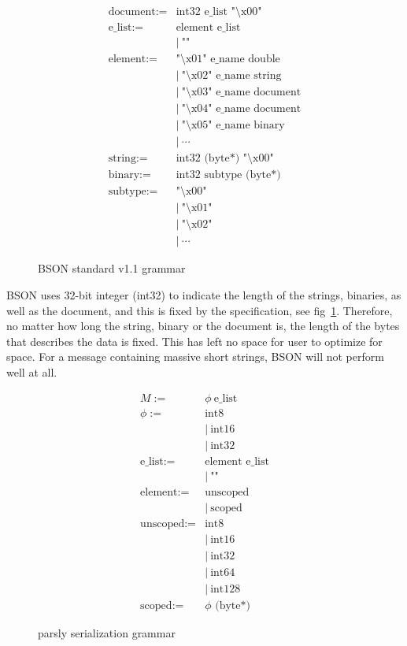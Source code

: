 \documentclass{article}
\begin{document}
\begin{figure}[h!]
\begin{align*}
\text{document} :=&  \text{int32 e\_list "\textbackslash x00" } \\
\text{e\_list} :=& \text{element e\_list} \\
&| \ \text{""} \\
\text{element}	:=& \text{"\textbackslash x01" e\_name double} \\
&| \ \text{"\textbackslash x02" e\_name string} \\
&| \ \text{"\textbackslash x03" e\_name document} \\
&| \ \text{"\textbackslash x04" e\_name document} \\
&| \ \text{"\textbackslash x05" e\_name binary} \\
&| \ \cdots \\
\text{string} :=& \text{int32 (byte*) "\textbackslash x00"} \\
\text{binary} :=& \text{int32 subtype (byte*)} \\
\text{subtype} :=& \text{"\textbackslash x00"} \\
&| \ \text{"\textbackslash x01"} \\
&| \ \text{"\textbackslash x02"} \\
&| \ \cdots 
\end{align*}
\caption{BSON standard v1.1 grammar}
\label{eq:bsonGrammar}
\end{figure}

BSON uses 32-bit integer (int32) to indicate the length of the strings, binaries, as well as the document, and this is fixed by the specification, see fig~\ref{eq:bsonGrammar}. Therefore, no matter how long the string, binary or the document is, the length of the bytes that describes the data is fixed. This has left no space for user to optimize for space. For a message containing massive short strings, BSON will not perform well at all.  \\

\begin{figure}[h!]
\begin{align*}
M :=& \phi \ \text{e\_list} \\
\phi :=& \text{int8} \\
&| \ \text{int16} \\
&| \ \text{int32} \\
\text{e\_list} :=& \text{element } \text{e\_list}\\
&| \ \text{""} \\
\text{element}	:=& \text{unscoped} \\
&| \ \text{scoped} \\
\text{unscoped} :=& \text{int8} \\
&| \ \text{int16} \\
&| \ \text{int32} \\
&| \ \text{int64} \\
&| \ \text{int128} \\
\text{scoped} :=& \phi  \text{ (byte*)} 
\end{align*}
\caption{parsly serialization grammar}
\label{eq:parslyGrammar}
\end{figure}
\end{document}
